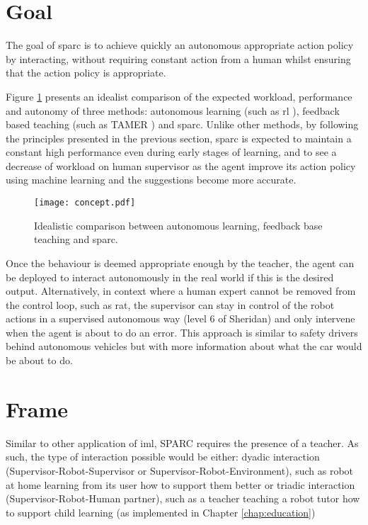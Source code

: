 \section{Goal}

The goal of \gls{sparc} is to achieve quickly an autonomous appropriate action policy by interacting, without requiring constant action from a human whilst ensuring that the action policy is appropriate. 

Figure \ref{fig:concept} presents an idealist comparison of the expected workload, performance and autonomy of three methods: autonomous learning (such as \gls{rl} \cite{sutton1998reinforcement}), feedback based teaching (such as TAMER \cite{knox2009interactively}) and \gls{sparc}. Unlike other methods, by following the principles presented in the previous section, \gls{sparc} is expected to maintain a constant high performance even during early stages of learning, and to see a decrease of workload on human supervisor as the agent improve its action policy using machine learning and the suggestions become more accurate.

\begin{figure}[ht]
	\texttt{[image: concept.pdf]}
	\centering
	\caption{Idealistic comparison between autonomous learning, feedback base teaching and \gls{sparc}.}
	\label{fig:concept}
\end{figure}

Once the behaviour is deemed appropriate enough by the teacher, the agent can be deployed to interact autonomously in the real world if this is the desired output. Alternatively, in context where a human expert cannot be removed from the control loop, such as \acrlong{rat}, the supervisor can stay in control of the robot actions in a supervised autonomous way (level 6 of Sheridan) and only intervene when the agent is about to do an error. This approach is similar to safety drivers behind autonomous vehicles but with more information about what the car would be about to do. 

\section{Frame}

Similar to other application of \gls{iml}, SPARC requires the presence of a teacher. As such, the type of interaction possible would be either: dyadic interaction (Supervisor-Robot-Supervisor or Supervisor-Robot-Environment), such as  robot at home learning from its user how to support them better or triadic interaction (Supervisor-Robot-Human partner), such as a teacher teaching a robot tutor how to support child learning (as implemented in Chapter \ref{chap:education})

